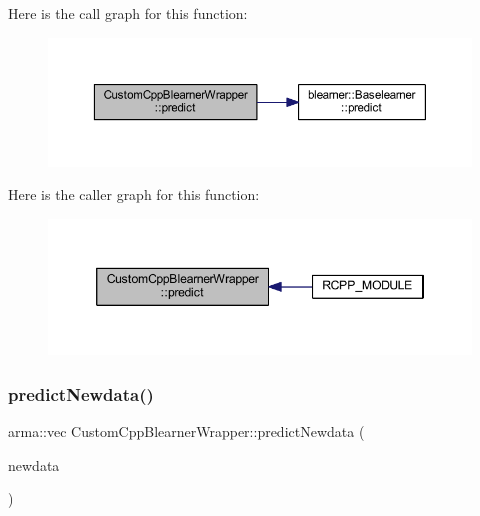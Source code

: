 Here is the call graph for this function\+:\nopagebreak
\begin{figure}[H]
\begin{center}
\leavevmode
\includegraphics[width=350pt]{class_custom_cpp_blearner_wrapper_adc2c36f510b88052f2fd599b3e737ee2_cgraph}
\end{center}
\end{figure}
Here is the caller graph for this function\+:\nopagebreak
\begin{figure}[H]
\begin{center}
\leavevmode
\includegraphics[width=346pt]{class_custom_cpp_blearner_wrapper_adc2c36f510b88052f2fd599b3e737ee2_icgraph}
\end{center}
\end{figure}
\mbox{\label{class_custom_cpp_blearner_wrapper_abc89ab2789f72dad6eccdcdfa01ecbc4}} 
\subsubsection{\texorpdfstring{predict\+Newdata()}{predictNewdata()}}
{\footnotesize\ttfamily arma\+::vec Custom\+Cpp\+Blearner\+Wrapper\+::predict\+Newdata (\begin{DoxyParamCaption}\item[{\mbox{\hyperlink{class_data_wrapper}{Data\+Wrapper}} \&}]{newdata }\end{DoxyParamCaption})\hspace{0.3cm}{\ttfamily [inline]}}

